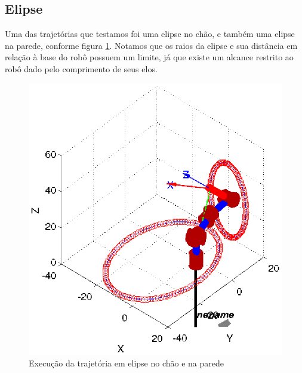 \documentclass{article}
\begin{document}
\subsection{Elipse}
Uma das trajetórias que testamos foi uma elipse no chão, e também uma elipse na parede, conforme figura \ref{fig:elipsec}. Notamos que os raios da elipse e sua distância em relação à base do robô possuem um limite, já que existe um alcance restrito ao robô dado pelo comprimento de seus elos.

\begin{figure}[H]
	\centering
	\includegraphics[width=0.8\linewidth]{../ellipses}
	\caption{Execução da trajetória em elipse no chão e na parede}
	\label{fig:elipsec}
\end{figure}
\end{document}
